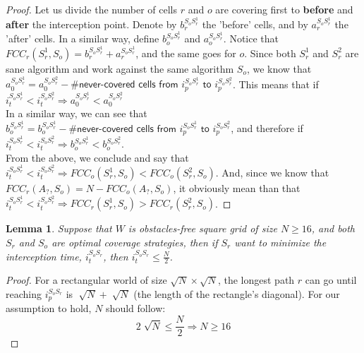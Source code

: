 \documentclass[a4paper,10pt]{article}
\newtheorem{lemma}[theorem]{Lemma}
\newcommand\rob{\ensuremath{r}\xspace}
\newcommand\opp{\ensuremath{o}\xspace}
\newcommand{\w}{\ensuremath{W}\xspace}
\newcommand{\fcc}{\ensuremath{FCC}\xspace}
\begin{document}
\begin{proof}
Let us divide the number of cells \rob and \opp are covering first to \textbf{before} and \textbf{after} the interception point. Denote by $b_r^{S_{\opp} S_{\rob}^1}$ the 'before' cells, and by $a_r^{S_{\opp} S_{\rob}^1}$ the 'after' cells. In a similar way, define $b_{\opp}^{S_{\opp} S_{\rob}^1}$ and $a_{\opp}^{S_{\opp} S_{\rob}^1}$. Notice that $\fcc_{\rob}(S_{\rob}^1, S_{\opp})=b_r^{S_{\opp} S_{\rob}^1}+a_r^{S_{\opp} S_{\rob}^1}$, and the same goes for \opp. 
Since both $S_{\rob}^1$ and $S_{\rob}^2$ are sane algorithm and work against the same algorithm $S_{\opp}$, we know that $a_0^{S_{\opp} S_{\rob}^1}=a_0^{S_{\opp} S_{\rob}^2}-\textsf{\# never-covered cells from $i_p^{S_{\opp} S_{\rob}^1}$ to $i_p^{S_{\opp} S_{\rob}^2}$}$. This means that if $i_t^{S_{\opp} S_{\rob}^1}<i_t^{S_{\opp} S_{\rob}^2}\Rightarrow a_0^{S_{\opp} S_{\rob}^1}<a_0^{S_{\opp} S_{\rob}^2}$
\\In a similar way, we can see that $b_{\opp}^{S_{\opp} S_{\rob}^1}=b_{\opp}^{S_{\opp} S_{\rob}^1}-\textsf{\# never-covered cells from $i_p^{S_{\opp} S_{\rob}^1}$ to $i_p^{S_{\opp} S_{\rob}^2}$}$, and therefore if $i_t^{S_{\opp} S_{\rob}^1}<i_t^{S_{\opp} S_{\rob}^2}\Rightarrow b_{\opp}^{S_{\opp} S_{\rob}^1}<b_{\opp}^{S_{\opp} S_{\rob}^2}$.
\\From the above, we conclude and say that $i_t^{S_{\opp} S_{\rob}^1}<i_t^{S_{\opp} S_{\rob}^2}\Rightarrow \fcc_{\opp}(S_{\rob}^1, S_{\opp})<\fcc_{\opp}(S_{\rob}^2, S_{\opp})$. And, since we know that $\fcc_{\rob}(A_?, S_{\opp})=N-\fcc_{\opp}(A_?, S_{\opp})$, it obviously mean than that $i_t^{S_{\opp} S_{\rob}^1}<i_t^{S_{\opp} S_{\rob}^2}\Rightarrow \fcc_{\rob}(S_{\rob}^1, S_{\opp})>\fcc_{\rob}(S_{\rob}^2, S_{\opp})$.
\end{proof}


\begin{lemma}\label{lemmas: bound on interception time}
Suppose that \w is obstacles-free square grid of size $N\geq 16$, and both $S_{\rob}$ and $S_{\opp}$ are optimal coverage strategies, then if $S_{\rob}$ want to minimize the interception time, $i_t^{S_{\opp} S_{\rob}}$, then $i_t^{S_{\opp} S_{\rob}}\leq \frac{N}{2}$.
\end{lemma}
\begin{proof}
For a rectangular world of size $\sqrt{N} \times \sqrt{N}$, the longest path \rob can go until reaching $i_p^{S_{\opp} S_{\rob}}$ is $\sqrt[]{N}+\sqrt[]{N}$ (the length of the rectangle's diagonal). For our assumption to hold, $N$ should follow: \[2\sqrt[]{N}\leq \frac{N}{2}\Rightarrow N\geq 16 \]
\end{proof}
\end{document}
